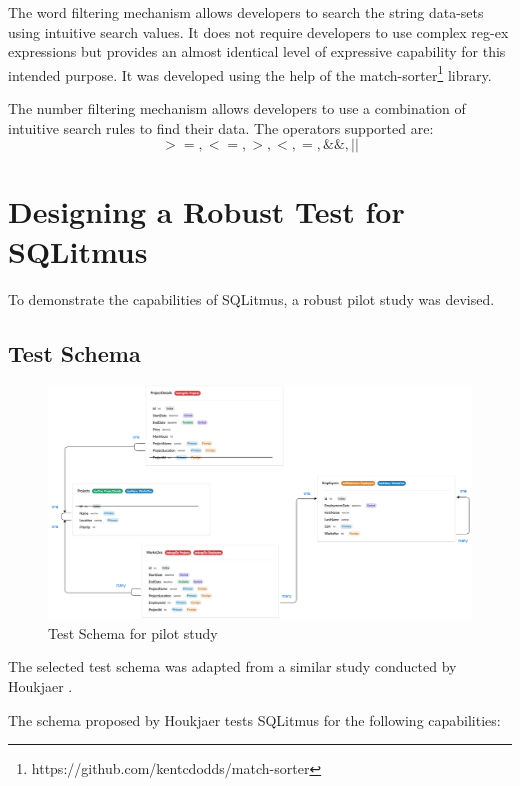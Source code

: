 \documentclass[12pt]{report}
\begin{document}
\begin{spacing}{1.9}
	The word filtering mechanism allows developers to search the string data-sets using intuitive search values. It does not require developers to use complex reg-ex expressions but provides an almost identical level of expressive capability for this intended purpose. It was developed using the help of the match-sorter\footnote{https://github.com/kentcdodds/match-sorter} library.
	
	The number filtering mechanism allows developers to use a combination of intuitive search rules to find their data. The operators supported are:
	\[>=, <=, >, <, =, \&\&, ||\]
	
	\pagebreak
	\chapter{Designing a Robust Test for SQLitmus}
	
	To demonstrate the capabilities of SQLitmus, a robust pilot study was devised.
	
	\section{Test Schema}
	
	\begin{figure}[H]
		\centering
		\includegraphics[width=\textwidth]{4-1.png}
		\caption{Test Schema for pilot study}
		
	\end{figure}
	
	The selected test schema was adapted from a similar study conducted by Houkjaer \cite{Houkjaer:2006}.
	
	The schema proposed by Houkjaer tests SQLitmus for the following capabilities:
	
	\begin{itemize}
		

\end{itemize}
\end{spacing}
\end{document}
